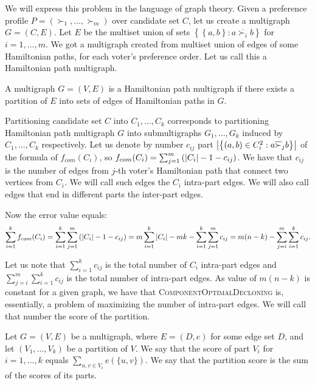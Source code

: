We will express this problem in the language of graph theory.
Given a preference profile $P = (\succ_1, ..., \succ_m)$ over candidate set $C$,
let us create a multigraph $G=(C,E)$.
Let $E$ be the multiset union of sets
$\left\lbrace \left\lbrace a,b \right\rbrace: a \overline{\succ_i} b \right\rbrace$ for $i=1, ..., m$.
We got a multigraph created from multiset union of edges of some Hamiltonian paths,
for each voter's preference order.
Let us call this a Hamiltonian path multigraph.

\begin{defn}
A multigraph $G=(V,E)$ is a Hamiltonian path multigraph if there exists a partition of $E$
into sets of edges of Hamiltonian paths in $G$.
\end{defn}

Partitioning candidate set $C$ into $C_1,...,C_k$ corresponds to
partitioning Hamiltonian path multigraph $G$ into submultigraphs $G_1,...,G_k$
induced by $C_1,...,C_k$ respectively.
Let us denote by number $c_{ij}$ part
$\left\vert \left\lbrace \left( a,b \right) \in C_i^2 : a \overline{\succ}_j b \right\rbrace  \right\vert$
of the formula of $f_{com}(C_i)$, so
$f_{com}(C_i) = \sum_{j=1}^m \left( \left\vert C_i \right\vert - 1 - c_{ij} \right)$.
We have that $c_{ij}$ is the number of edges from $j$-th voter's Hamiltonian path
that connect two vertices from $C_i$.
We will call such edges the $C_i$ intra-part edges.
We will also call edges that end in different parts the inter-part edges.

Now the error value equals:
$$
\sum_{i=1}^k f_{com}(C_i) =
\sum_{i=1}^k \sum_{j=1}^m \left( \left\vert C_i \right\vert - 1 - c_{ij} \right) =
m \sum_{i=1}^k \left\vert C_i \right\vert - m k - \sum_{i=1}^k \sum_{j=1}^m c_{ij} =
m(n-k) - \sum_{j=i}^m \sum_{i=1}^k c_{ij}
\text{.}$$

Let us note that $\sum_{i=1}^k c_{ij}$ is the total number of $C_i$ intra-part edges
and $\sum_{j=i}^m \sum_{i=1}^k c_{ij}$ is the total number of intra-part edges.
As value of $m(n-k)$ is constant for a given graph,
we have that \textsc{ComponentOptimalDecloning} is, essentially, a problem of maximizing the number of intra-part edges.
We will call that number the score of the partition.

\begin{defn}
Let $G=(V,E)$ be a multigraph, where $E=(D, e)$ for some edge set $D$,
and let $(V_1, ..., V_k)$ be a partition of $V$.
We say that the score of part $V_i$ for $i=1,...,k$ equals $\sum_{u,v \in V_i} e(\{u,v\})$.
We say that the partition score is the sum of the scores of its parts.
\end{defn}

